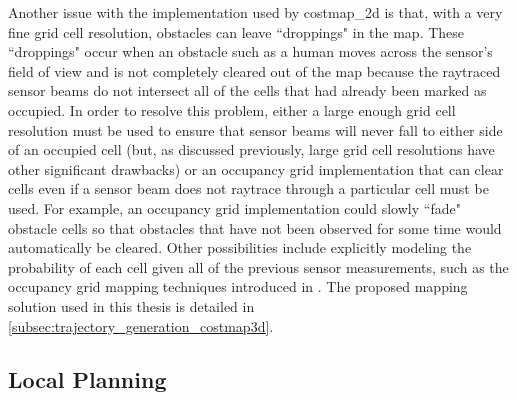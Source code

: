 Another issue with the implementation used by costmap\_2d is that, with a very fine grid cell resolution, obstacles can leave ``droppings" in the map. These ``droppings" occur when an obstacle such as a human moves across the sensor's field of view and is not completely cleared out of the map because the raytraced sensor beams do not intersect all of the cells that had already been marked as occupied. In order to resolve this problem, either a large enough grid cell resolution must be used to ensure that sensor beams will never fall to either side of an occupied cell (but, as discussed previously, large grid cell resolutions have other significant drawbacks) or an occupancy grid implementation that can clear cells even if a sensor beam does not raytrace through a particular cell must be used. For example, an occupancy grid implementation could slowly ``fade" obstacle cells so that obstacles that have not been observed for some time would automatically be cleared. Other possibilities include explicitly modeling the probability of each cell given all of the previous sensor measurements, such as the occupancy grid mapping techniques introduced in \autocite{Moravec_1985_1840}. The proposed mapping solution used in this thesis is detailed in \autoref{subsec:trajectory_generation_costmap3d}.

\subsection{Local Planning}\label{subsec:base_local_planner}


